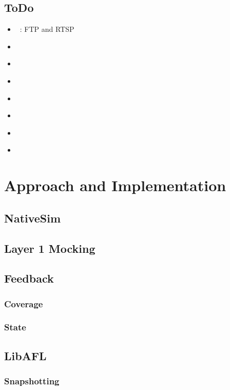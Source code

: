 \documentclass{article}
\let\savedCite=\cite
\renewcommand{\cite}{\unskip~\savedCite}
\begin{document}
\begin{multicols}{2}
  \subsection{ToDo}
  \begin{itemize}
    \item {}\cite{AFLNET}: FTP and RTSP
    \item {}\cite{Autofuzz}
    \item {}\cite{EPF}
    \item {}\cite{ModelBased}
    \item {}\cite{GANFuzz}
    \item {}\cite{TCPFuzz}
    \item {}\cite{FitM}
    \item {}\cite{Survey}
  \end{itemize}

  \section{Approach and Implementation}

  \subsection{NativeSim}

  \subsection{Layer 1 Mocking}

  \subsection{Feedback}

  \subsubsection{Coverage}
  \subsubsection{State}

  \subsection{LibAFL}
  \subsubsection{Snapshotting}

\end{multicols}
\end{document}
